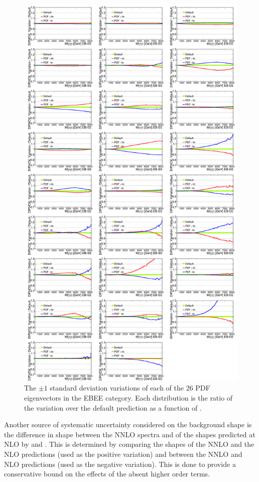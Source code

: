 \begin{figure}[!htbp]
	\centering
	\includegraphics[scale=0.27]{figures/SYS_PDF_EE.pdf}
	\caption{The $\pm1$ standard deviation variations of each of the 26 PDF eigenvectors in the EBEE category. Each distribution is the ratio of the variation over the default prediction as a function of \mgg.}
	\label{fig:sys_PDF_EE}
\end{figure}

Another source of systematic uncertainty considered on the background shape is the difference in shape between the NNLO \MCFM \mgg spectra and of the shapes predicted at NLO by \MCFM and \DIPHOX. This is determined by comparing the shapes of the \MCFM NNLO and the \MCFM NLO predictions (used as the positive variation) and between the \MCFM NNLO and \DIPHOX NLO predictions (used as the negative variation). This is done to provide a conservative bound on the effects of the absent higher order terms.

